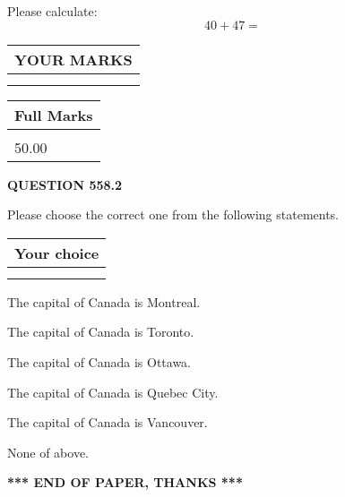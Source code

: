 \documentclass[12pt]{article}
\begin{document}
  
 
Please calculate:
\begin{equation}
40 +  %
47 = \nonumber
\end{equation}
 

 

 
  
\vspace{0.2in}
  
\noindent\begin{tabular}{|l|}
\hline
 YOUR MARKS  \\
\hline
 \\ 
 \\ 
\hline
\end{tabular}
\hspace{0.05in} \begin{tabular}{|l|}
\hline
 Full Marks  \\
\hline
 \\ 
50.00 \\
\hline
\end{tabular}
{\textbf{\Large{QUESTION
558.2 
}}}
  
  
Please choose the correct one from the following statements.
  
  
\noindent\hspace{3.0in} \begin{tabular}{|l|}
\hline
Your choice \\
\hline
 \\ 
 \\ 
\hline
\end{tabular}
  
  
 
 
The capital of Canada is Montreal.
 
 
The capital of Canada is Toronto.
 
 
The capital of Canada is Ottawa.
 
 
The capital of Canada is Quebec City.
 
 
The capital of Canada is Vancouver.
 
 
 None of above.
 
 
   
   
 \vspace{0.2in}
 
   
   
   
   
\vspace{1.0in} 
{\textbf{\large{ *** END OF PAPER, THANKS *** }}} 
   
\end{document}
